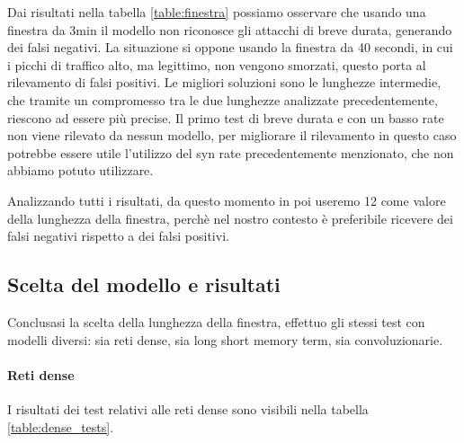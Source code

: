 Dai risultati nella tabella \ref{table:finestra} possiamo osservare che usando una finestra da 3min il modello non riconosce gli attacchi di breve durata, generando dei falsi negativi. La situazione si oppone usando la finestra da 40 secondi, in cui i picchi di traffico alto, ma legittimo, non vengono smorzati, questo porta al rilevamento di falsi positivi. Le migliori soluzioni sono le lunghezze intermedie, che tramite un compromesso tra le due lunghezze analizzate precedentemente, riescono ad essere più precise.
Il primo test di breve durata e con un basso rate non viene rilevato da nessun modello, per migliorare il rilevamento in questo caso potrebbe essere utile l'utilizzo del syn rate precedentemente menzionato, che non abbiamo potuto utilizzare.

Analizzando tutti i risultati, da questo momento in poi useremo 12 come valore della lunghezza della finestra, perchè nel nostro contesto è preferibile ricevere dei falsi negativi rispetto a dei falsi positivi.


\subsection{Scelta del modello e risultati}

Conclusasi la scelta della lunghezza della finestra, effettuo gli stessi test con modelli diversi: sia reti dense, sia long short memory term, sia convoluzionarie.

\paragraph{Reti dense} I risultati dei test relativi alle reti dense sono visibili nella tabella \ref{table:dense_tests}.


